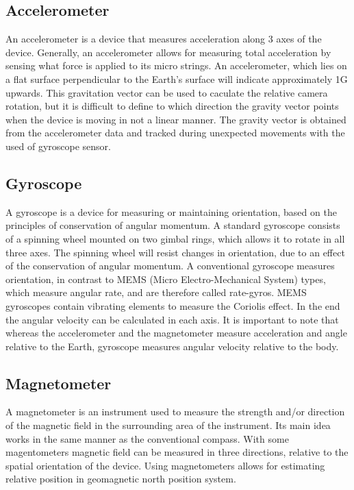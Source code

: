 \subsection{Accelerometer\cite{website:accelerometer}}
An accelerometer is a device that measures acceleration along 3 axes of the device. Generally, an accelerometer allows for measuring total acceleration by sensing what force is applied to its micro strings. An accelerometer, which lies on a flat surface perpendicular to the Earth's surface will indicate approximately 1G upwards. This gravitation vector can be used to caculate the relative camera rotation, but it is difficult to define to which direction the gravity vector points when the device is moving in not a linear manner. The gravity vector is obtained from the accelerometer data and tracked during unexpected movements with the used of gyroscope sensor.
\subsection{Gyroscope\cite{website:gyroscope}}
A gyroscope is a device for measuring or maintaining orientation, based on the principles of conservation of angular momentum. A standard gyroscope consists of a spinning wheel mounted on two gimbal rings, which allows it to rotate in all three axes. The spinning wheel will resist changes in orientation, due to an effect of the conservation of angular momentum. A conventional gyroscope measures orientation, in contrast to MEMS (Micro Electro-Mechanical System) types, which measure
angular rate, and are therefore called rate-gyros. MEMS gyroscopes contain vibrating elements to measure the Coriolis effect. In the end the angular velocity can be calculated in each axis. It is important to note that whereas the accelerometer and the magnetometer measure acceleration and angle relative to the Earth, gyroscope measures angular velocity
relative to the body.
\subsection{Magnetometer\cite{website:magnetometer}}
A magnetometer is an instrument used to measure the strength and/or direction of the magnetic field in the surrounding area of the instrument. Its main idea works in the same manner as the conventional compass. With some magentometers magnetic field can be measured in three directions, relative to the spatial orientation of the device. Using magnetometers allows for estimating relative position in geomagnetic north position system. 
